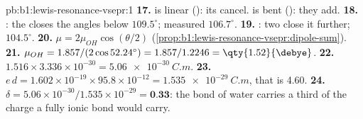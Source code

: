\begin{solution}{pb:b1:lewis-resonance-vsepr:1}
\textbf{17.}  is linear (): its  cancel.
 is bent (): they add.
\textbf{18.} : the  closes the angles below
$109.5^\circ$; measured $106.7^\circ$.
\textbf{19.} : two  close it further; $104.5^\circ$.
\textbf{20.} $\mu = 2\mu_{OH}\cos(\theta/2)$
(\cref{prop:b1:lewis-resonance-vsepr:dipole-sum}).
\textbf{21.} $\mu_{OH} = 1.857/(2\cos 52.24^\circ) = 1.857/1.2246 =
\qty{1.52}{\debye}$.
\textbf{22.} $1.516 \times 3.336 \times 10^{-30} = \qty{5.06e-30}{C.m}$.
\textbf{23.} $e\,d = 1.602 \times 10^{-19} \times 95.8 \times 10^{-12} =
\qty{1.535e-29}{C.m}$, that is \qty{4.60}{\debye}.
\textbf{24.} $\delta = 5.06 \times 10^{-30}/1.535 \times 10^{-29} =
\textbf{0.33}$: the  bond of water carries a third of the charge
a fully ionic bond would carry.
\end{solution}
